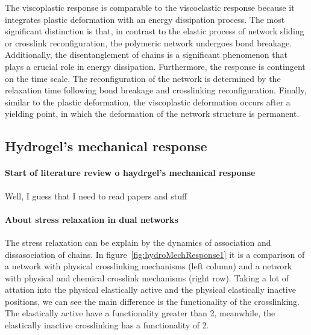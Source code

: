 The viscoplastic response is comparable to the viscoelastic response because it integrates plastic deformation with an energy dissipation process.
The most significant distinction is that, in contrast to the elastic process of network sliding or crosslink reconfiguration, the polymeric network undergoes bond breakage.
Additionally, the disentanglement of chains is a significant phenomenon that plays a crucial role in energy dissipation.
Furthermore, the response is contingent on the time scale. 
The reconfiguration of the network is determined by the relaxation time following bond breakage and crosslinking reconfiguration.
Finally, similar to the plastic deformation, the viscoplastic deformation occurs after a yielding point, in which the deformation of the network structure is permanent.

\subsection{Hydrogel's mechanical response}

\paragraph{Start of literature review o haydrgel's mechanical response} Well, I guess that I need to read papers and stuff%

\paragraph{About stress relaxation in dual networks}
The stress relaxation can be explain by the dynamics of association and dissasociation of chains\citep{naritaViscoelasticPropertiesPolyvinyl2013}.
In figure~\ref{fig:hydroMechResponse1} it is a comparison of a network with physical crosslinking mechanisms (left column) and a network with physical and chemical crosslink mechanisms (right row).
Taking a lot of attation into the physical elastically active and the physical elastically inactive positions, we can see the main difference is the functionality of the crosslinking.
The elastically active have a functionality greater than 2, meanwhile, the elastically inactive crosslinking has a functionality of 2. 

